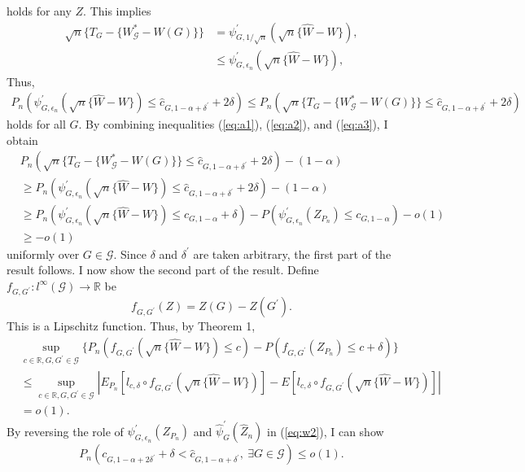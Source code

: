 \documentclass[12pt,oneside,reqno,english]{amsart}
\theoremstyle{definition}
\begin{document}
holds for any $Z$. This implies 
\begin{align*}
\sqrt{n}\{T_{G}-\{W^{*}_{\mathcal{G}}-W(G)\}\}&=\psi^{\prime}_{G,1/\sqrt{n}}(\sqrt{n}\{\hat{W}-W\}), \\
&\leq \psi^{\prime}_{G,\epsilon_{n}}(\sqrt{n}\{\hat{W}-W\}),
\end{align*}
Thus, 
\begin{align}
P_{n}( \psi^{\prime}_{G,\epsilon_{n}}(\sqrt{n}\{\hat{W}-W\}) \leq \hat{c}_{G,1-\alpha+\delta^{\prime}}+2\delta)\leq
P_{n}(\sqrt{n}\{T_{G}-\{W^{*}_{\mathcal{G}}-W(G)\}\} \leq \hat{c}_{G,1-\alpha+\delta^{\prime}}+2\delta)
\label{eq:a3} 
\end{align}
holds for all $G$. 
By combining inequalities (\ref{eq:a1}), (\ref{eq:a2}), and (\ref{eq:a3}), I obtain
\begin{align*}
&P_{n}(\sqrt{n}\{T_{G}-\{W^{*}_{\mathcal{G}}-W(G)\}\} \leq \hat{c}_{G,1-\alpha+\delta^{\prime}}+2\delta)-(1-\alpha)\\
&\geq P_{n}( \psi^{\prime}_{G,\epsilon_{n}}(\sqrt{n}\{\hat{W}-W\}) \leq \hat{c}_{G,1-\alpha+\delta^{\prime}}+2\delta)-(1-\alpha)\\
&\geq P_{n}( \psi^{\prime}_{G,\epsilon_{n}}(\sqrt{n}\{\hat{W}-W\}) \leq c_{G,1-\alpha}+\delta)-P(\psi^{\prime}_{G,\epsilon_{n}}(Z_{P_{n}})\leq c_{G,1-\alpha})-o(1)\\
&\geq -o(1)
\end{align*}
uniformly over $G\in \mathcal{G}$. Since $\delta$ and $\delta^{\prime}$ are taken arbitrary, the first part of the result follows.
 I now show the second part of the result. 
Define $f_{G,G^{\prime}}:l^{\infty}(\mathcal{G})\rightarrow \mathbb{R}$ be
\[f_{G,G^{\prime}}(Z)=Z(G)-Z(G^{\prime}).\]
This is a Lipschitz function. Thus, by Theorem 1, 
\begin{align*}
&\sup_{c\in \mathbb{R}, G,G^{\prime}\in \mathcal{G}}
\{P_{n}(f_{G,G^{\prime}}(\sqrt{n}\{\hat{W}-W\})\leq c)-P(f_{G,G^{\prime}}(Z_{P_{n}})\leq c+\delta)\}\\
&\leq 
\sup_{c\in \mathbb{R},G,G^{\prime}\in \mathcal{G}}|E_{P_{n}}[l_{c,\delta}\circ f_{G,G^{\prime}}(\sqrt{n}\{\hat{W}-W\})]
-E[l_{c,\delta}\circ f_{G,G^{\prime}}(\sqrt{n}\{\hat{W}-W\})]|\nonumber\\
&=o(1).
\end{align*}
By reversing the role of $\psi^{\prime}_{G,\epsilon_{n}}(Z_{P_{n}})$ and $\hat{\psi}_{G}^{\prime}(\hat{Z}_{n})$ in (\ref{eq:w2}), I can show 
\[P_{n}(c_{G,1-\alpha+2\delta^{\prime}}+\delta <\hat{c}_{G,1-\alpha+\delta^{\prime}},\ \exists G\in \mathcal{G})\leq o(1).\]
\end{document}
